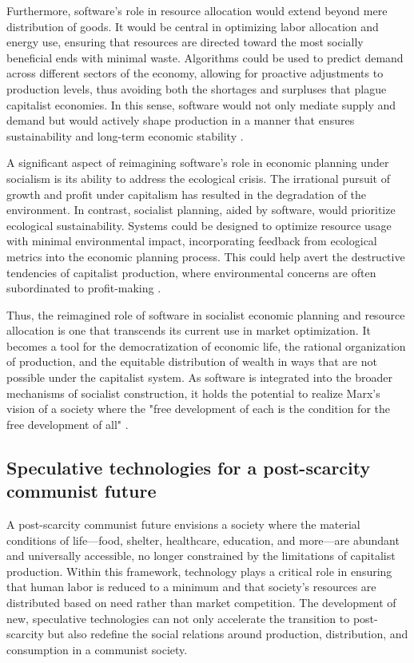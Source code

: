 \begin{refsection}
Furthermore, software’s role in resource allocation would extend beyond mere distribution of goods. It would be central in optimizing labor allocation and energy use, ensuring that resources are directed toward the most socially beneficial ends with minimal waste. Algorithms could be used to predict demand across different sectors of the economy, allowing for proactive adjustments to production levels, thus avoiding both the shortages and surpluses that plague capitalist economies. In this sense, software would not only mediate supply and demand but would actively shape production in a manner that ensures sustainability and long-term economic stability \cite[pp.~120-122]{marx1867}.

A significant aspect of reimagining software’s role in economic planning under socialism is its ability to address the ecological crisis. The irrational pursuit of growth and profit under capitalism has resulted in the degradation of the environment. In contrast, socialist planning, aided by software, would prioritize ecological sustainability. Systems could be designed to optimize resource usage with minimal environmental impact, incorporating feedback from ecological metrics into the economic planning process. This could help avert the destructive tendencies of capitalist production, where environmental concerns are often subordinated to profit-making \cite[pp.~298-301]{kropotkin1902}.

Thus, the reimagined role of software in socialist economic planning and resource allocation is one that transcends its current use in market optimization. It becomes a tool for the democratization of economic life, the rational organization of production, and the equitable distribution of wealth in ways that are not possible under the capitalist system. As software is integrated into the broader mechanisms of socialist construction, it holds the potential to realize Marx's vision of a society where the "free development of each is the condition for the free development of all" \cite[pp.~276-278]{marx1848}.

\subsection{Speculative technologies for a post-scarcity communist future}

A post-scarcity communist future envisions a society where the material conditions of life—food, shelter, healthcare, education, and more—are abundant and universally accessible, no longer constrained by the limitations of capitalist production. Within this framework, technology plays a critical role in ensuring that human labor is reduced to a minimum and that society’s resources are distributed based on need rather than market competition. The development of new, speculative technologies can not only accelerate the transition to post-scarcity but also redefine the social relations around production, distribution, and consumption in a communist society.


\end{refsection}
